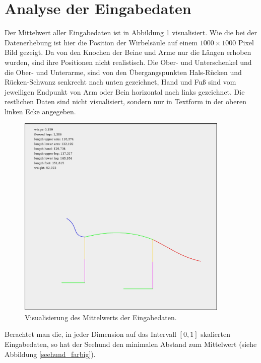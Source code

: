  \section{Analyse der Eingabedaten}
 
 Der Mittelwert aller Eingabedaten ist in Abbildung \ref{mean_log_weight} visualisiert. Wie die bei der Datenerhebung ist hier die Position der Wirbelsäule auf einem $1000 \times 1000$ Pixel Bild gezeigt. Da von den Knochen der Beine und Arme nur die Längen erhoben wurden, sind ihre Positionen nicht realistisch. Die Ober- und Unterschenkel und die Ober- und Unterarme, sind von den Übergangspunkten Hals-Rücken und Rücken-Schwanz senkrecht nach unten gezeichnet, Hand und Fuß sind vom jeweiligen Endpunkt von Arm oder Bein horizontal nach links gezeichnet. Die restlichen Daten sind nicht visualisiert, sondern nur in Textform in der oberen linken Ecke angegeben.
 
 \begin{figure}
  \centering
  \includegraphics[width=0.9\textwidth]{../PCA/mean_log_weight.jpg}
  \caption{Visualisierung des Mittelwerts der Eingabedaten.}
  \label{mean_log_weight}
 \end{figure}
 
 Berachtet man die, in jeder Dimension auf das Intervall $[0, 1]$ skalierten Eingabedaten, so hat der Seehund den minimalen Abstand zum Mittelwert (siehe Abbildung \ref{seehund_farbig}).
 
